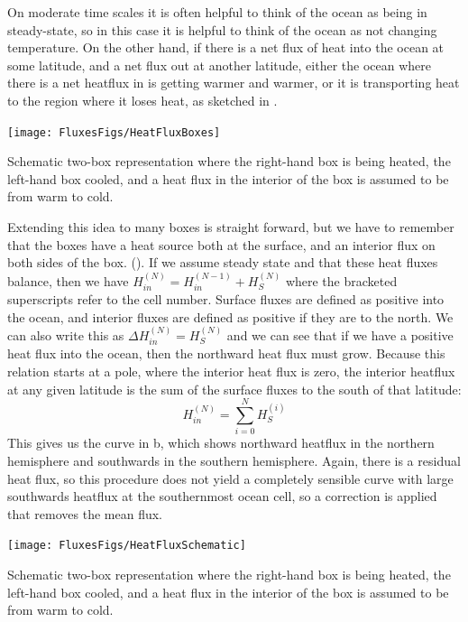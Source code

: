 On moderate time scales it is often helpful to think of the ocean as being in steady-state, so in this case it is helpful to think of the ocean as not changing temperature.  On the other hand, if there is a net flux of heat into the ocean at some latitude, and a net flux out at another latitude, either the ocean where there is a net heatflux in is getting warmer and warmer, or it is transporting heat to the region where it loses heat, as sketched in . 


\begin{marginfigure}
\texttt{[image: FluxesFigs/HeatFluxBoxes]}
 \caption{Schematic two-box representation where the right-hand box is being heated, the left-hand box cooled, and a heat flux in the interior of the box is assumed to be from warm to cold.}
  \label{fig:HeatFluxBoxes}
\end{marginfigure}

Extending this idea to many boxes is straight forward, but we have to remember that the boxes have a heat source both at the surface, and an interior flux on both sides of the box.   (). If we assume steady state and that these heat fluxes balance, then we have $H_{in}^{(N)} = H_{in}^{(N-1)} + H_S^{(N)}$ where the bracketed superscripts refer to the cell number. Surface fluxes are defined as positive into the ocean, and interior fluxes are defined as positive if they are to the north.  We can also write this as $\Delta H_{in}^{(N)} = H_S^{(N)}$ and we can see that if we have a positive heat flux into the ocean, then the northward heat flux must grow.  Because this relation starts at a pole, where the interior heat flux is zero, the interior heatflux at any given latitude is the sum of the surface fluxes to the south of that latitude: 
\begin{equation}
    H_{in}^{(N)} = \sum_{i=0}^N H_{S}^{(i)}
\end{equation}
This gives us the curve in b, which shows northward heatflux in the northern hemisphere and southwards in the southern hemisphere.  Again, there is a residual heat flux, so this procedure does not yield a completely sensible curve with large southwards heatflux at the southernmost ocean cell, so a correction is applied that removes the mean flux.  

\begin{marginfigure}
\texttt{[image: FluxesFigs/HeatFluxSchematic]}
 \caption{Schematic two-box representation where the right-hand box is being heated, the left-hand box cooled, and a heat flux in the interior of the box is assumed to be from warm to cold.}
  \label{fig:HeatFluxSchematic}
\end{marginfigure}

